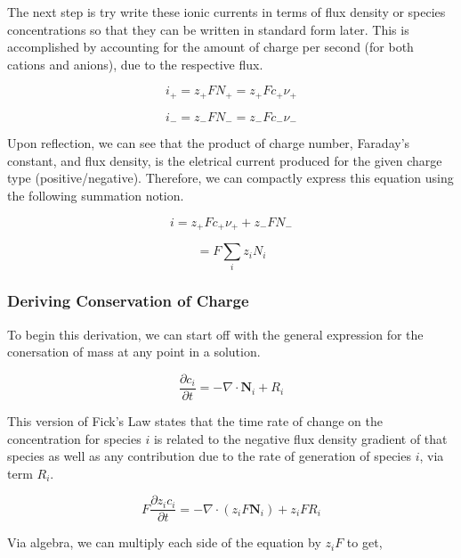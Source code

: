 \documentclass[lettersize,journal]{IEEEtran}
\begin{document}
The next step is try write these ionic currents in terms of flux density or species concentrations so that they can be written in standard form later. This is accomplished by accounting for the amount of charge per second (for both cations and anions), due to the respective flux.

\begin{equation}
    i_+ =  z_+ FN_+ = z_{+}Fc_{+}\nu_{+}
\end{equation}

\begin{equation}
  i_- =  z_- FN_- = z_{-}Fc_{-}\nu_{-}
\end{equation}

Upon reflection, we can see that the product of charge number, Faraday's constant, and flux density, is the eletrical current produced for the given charge type (positive/negative). Therefore, we can compactly express this equation using the following summation notion.

\begin{equation}
  i = z_{+}Fc_{+}\nu_{+} + z_- FN_-
\end{equation}

\begin{equation}
  = F\sum_{i}z_{i}N_{i}
\end{equation}

\subsubsection{ Deriving Conservation of Charge}

To begin this derivation, we can start off with the general expression for the conersation of mass at any point in a solution.

\begin{equation}
  \frac{\partial c_{i}}{\partial t}=-\nabla \cdot \mathbf{N}_{i}+R_{i}
\end{equation}

This version of Fick's Law states that the time rate of change on the concentration for species $i$ is related to the negative flux density gradient of that species as well as any contribution due to the rate of generation of species $i$, via term $R_{i}$.

\begin{equation}
  F \frac{\partial z_{i} c_{i}}{\partial t}=-\nabla \cdot\left(z_{i} F \mathbf{N}_{i}\right)+z_{i} F R_{i}
\end{equation}

Via algebra, we can multiply each side of the equation by $z_{i}F$ to get,
\end{document}
